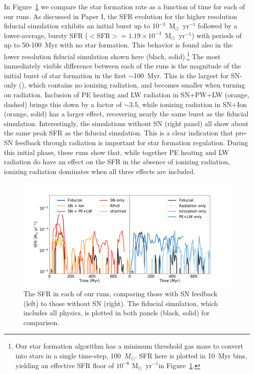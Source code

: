 \documentclass[twocolumn]{aastex62}
\newcommand{\methodpaper}{Paper I}
\newcommand{\fiducialstyle}{black, solid}
\newcommand{\snionstyle}{orange, solid}
\newcommand{\snpelwstyle}{orange, dashed}
\newcommand{\sfrunits}{M$_{\odot}$~yr$^{-1}$}
\begin{document}
In Figure~\ref{fig:SFR} we compare the star formation rate as a function of time for each of our runs. As discussed in \methodpaper, the SFR evolution for the higher resolution fiducial simulation exhibits an initial burst up to 10$^{-3}$~M$_{\odot}$~yr$^{-1}$ followed by a lower-average, bursty SFR ($<$SFR$> = 1.19\times 10^{-4}$~M$_{\odot}$~yr$^{-1}$) with periods of up to 50-100~Myr with no star formation. This behavior is found also in the lower resolution fiducial simulation shown here (\fiducialstyle).\footnote{Our star formation algorithm has a minimum threshold gas mass to convert into stars in a single time-step, 100~$M_{\odot}$. SFR here is plotted in 10~Myr bins, yielding an effective SFR floor of $10^{-6}$ \sfrunits in Figure~\ref{fig:SFR}.} The most immediately visible difference between each of the runs is the magnitude of the initial burst of star formation in the first $\sim$100~Myr. This is the largest for SN-only (\snstyle), which contains no ionizing radiation, and becomes smaller when turning on radiation. Inclusion of PE heating and LW radiation in SN+PW+LW (\snpelwstyle) brings this down by a factor of $\sim$3.5, while ionizing radiation in SN+Ion (\snionstyle) has a larger effect, recovering nearly the same burst as the fiducial simulation. Interestingly, the simulations without SN (right panel) all show about the same peak SFR as the fiducial simulation. This is a clear indication that pre-SN feedback through radiation is important for star formation regulation. During this initial phase, these runs show that, while together PE heating and LW radiation do have an effect on the SFR in the absence of ionizing radiation, ionizing radiation dominates when all three effects are included.

\begin{figure}
  \centering
  \includegraphics[width=0.98\linewidth]{figures/physics_comparison_sfr_2}
  \caption{The SFR in each of our runs, comparing those with SN feedback (left) to those without SN (right). The fiducial simulation, which includes all physics, is plotted in both panels (\fiducialstyle) for comparison.}
  \label{fig:SFR}
\end{figure}
\end{document}
